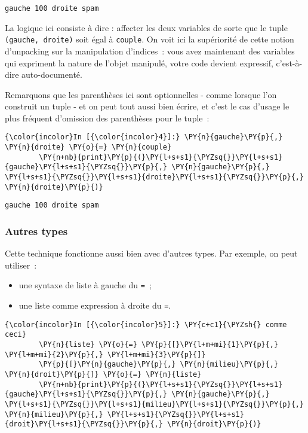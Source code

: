     \begin{Verbatim}[commandchars=\\\{\}]
gauche 100 droite spam

    \end{Verbatim}

    La logique ici consiste à dire : affecter les deux variables de sorte
que le tuple \texttt{(gauche,\ droite)} soit égal à \texttt{couple}. On
voit ici la supériorité de cette notion d'unpacking sur la manipulation
d'indices~: vous avez maintenant des variables qui expriment la nature
de l'objet manipulé, votre code devient expressif, c'est-à-dire
auto-documenté.

Remarquons que les parenthèses ici sont optionnelles - comme lorsque
l'on construit un tuple - et on peut tout aussi bien écrire, et c'est le
cas d'usage le plus fréquent d'omission des parenthèses pour le tuple~:

    \begin{Verbatim}[commandchars=\\\{\}]
{\color{incolor}In [{\color{incolor}4}]:} \PY{n}{gauche}\PY{p}{,} \PY{n}{droite} \PY{o}{=} \PY{n}{couple}
        \PY{n+nb}{print}\PY{p}{(}\PY{l+s+s1}{\PYZsq{}}\PY{l+s+s1}{gauche}\PY{l+s+s1}{\PYZsq{}}\PY{p}{,} \PY{n}{gauche}\PY{p}{,} \PY{l+s+s1}{\PYZsq{}}\PY{l+s+s1}{droite}\PY{l+s+s1}{\PYZsq{}}\PY{p}{,} \PY{n}{droite}\PY{p}{)}
\end{Verbatim}


    \begin{Verbatim}[commandchars=\\\{\}]
gauche 100 droite spam

    \end{Verbatim}

    \hypertarget{autres-types}{%
\subsubsection{Autres types}\label{autres-types}}

    Cette technique fonctionne aussi bien avec d'autres types. Par exemple,
on peut utiliser~:

\begin{itemize}
\tightlist
\item
  une syntaxe de liste à gauche du \texttt{=}~;
\item
  une liste comme expression à droite du \texttt{=}.
\end{itemize}

    \begin{Verbatim}[commandchars=\\\{\}]
{\color{incolor}In [{\color{incolor}5}]:} \PY{c+c1}{\PYZsh{} comme ceci}
        \PY{n}{liste} \PY{o}{=} \PY{p}{[}\PY{l+m+mi}{1}\PY{p}{,} \PY{l+m+mi}{2}\PY{p}{,} \PY{l+m+mi}{3}\PY{p}{]}
        \PY{p}{[}\PY{n}{gauche}\PY{p}{,} \PY{n}{milieu}\PY{p}{,} \PY{n}{droit}\PY{p}{]} \PY{o}{=} \PY{n}{liste}
        \PY{n+nb}{print}\PY{p}{(}\PY{l+s+s1}{\PYZsq{}}\PY{l+s+s1}{gauche}\PY{l+s+s1}{\PYZsq{}}\PY{p}{,} \PY{n}{gauche}\PY{p}{,} \PY{l+s+s1}{\PYZsq{}}\PY{l+s+s1}{milieu}\PY{l+s+s1}{\PYZsq{}}\PY{p}{,} \PY{n}{milieu}\PY{p}{,} \PY{l+s+s1}{\PYZsq{}}\PY{l+s+s1}{droit}\PY{l+s+s1}{\PYZsq{}}\PY{p}{,} \PY{n}{droit}\PY{p}{)}
\end{Verbatim}


